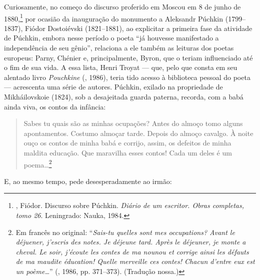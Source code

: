 Curiosamente, no começo do discurso proferido em Moscou em 8 de junho de
1880,\footnote{, Fiódor. Discurso sobre Púchkin. \emph{Diário de um escritor. Obras completas, tomo 26}. Leningrado: Nauka, 1984.} por ocasião da inauguração do monumento a Aleksandr Púchkin
(1799--1837), Fiódor Dostoiévski (1821--1881), ao explicitar a primeira fase da atividade de Púchkin, embora nesse período o poeta ``já houvesse manifestado a independência de seu gênio'', relaciona a
ele também as
leituras dos poetas europeus: Parny, Chénier e, principalmente, Byron,
que o teriam influenciado até o fim de sua vida. A essa lista, Henri
Troyat --- que, pelo que consta em seu alentado livro \emph{Pouchkine} (, 1986),
teria tido acesso à biblioteca pessoal do poeta --- acrescenta uma série
de autores. Púchkin, exilado na propriedade de Mikháilovskoie (1824), sob a
desajeitada guarda paterna, recorda, com a babá
ainda viva, os contos da infância:

\begin{quotation}
Sabes tu quais são as minhas ocupações? Antes do almoço tomo alguns apontamentos. Costumo almoçar tarde. Depois do almoço cavalgo. À noite ouço os contos de minha babá e corrijo, assim, os defeitos de minha maldita educação. Que maravilha esses contos! Cada um deles é um poema\ldots{}\footnote{Em francês no original: ``\emph{Sais-tu quelles sont mes occupations? Avant le déjuener, j'escris des notes. Je déjeune tard. Après le déjeuner, je monte a cheval. Le soir, j'écoute les contes de ma nounou et corrige ainsi les défauts de ma maudite éducation! Quelle merveille ces contes! Chacun d'entre eux est un poème\ldots{}}'' (, 1986, pp. 371--373). (Tradução nossa.)}
\end{quotation}


E, ao mesmo tempo, pede desesperadamente ao irmão:

